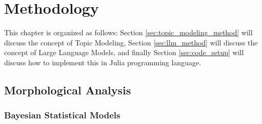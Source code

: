 
\chapter{Methodology}
This chapter is organized as follows: Section \ref{sec:topic_modeling_method} will discuss the concept of Topic Modeling, Section \ref{sec:llm_method} will discuss the concept of Large Language Models, and finally Section \ref{sec:code_setup} will discuss how to implement this in Julia programming language.
\section{Morphological Analysis}
\subsection{Bayesian Statistical Models}

